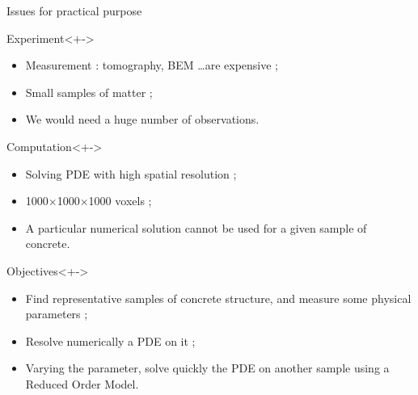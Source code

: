 \begin{frame}{Issues for practical purpose}
%
\begin{block}{Experiment}<+->
\begin{itemize}
\item<+-> Measurement : tomography, BEM \dots are expensive ;
\item<+-> Small samples of matter ;
\item<+-> We would need a huge number of observations.
\end{itemize}
\end{block}
%
\begin{block}{Computation}<+->
\begin{itemize}
\item<+-> Solving PDE with high spatial resolution ;
\item<+-> 1000$\times$1000$\times$1000 voxels ;
\item<+-> A particular numerical solution cannot be used for a given sample of concrete.
\end{itemize}
\end{block}
%
\begin{block}{Objectives}<+->
\begin{itemize}
\item<+-> Find representative samples of concrete structure, and measure some physical parameters ;
\item<+-> Resolve numerically a PDE on it ;
\item<+-> Varying the parameter, solve quickly the PDE on another sample using a Reduced Order Model.
\end{itemize}
\end{block}
%
\end{frame}